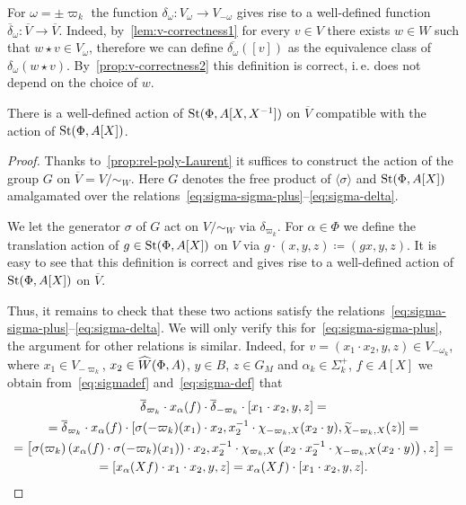 For $\omega = \pm \varpi_k$ the function $\delta_\omega \colon V_{\omega} \to V_{-\omega}$ gives rise to a well-defined function $\overline{\delta}_\omega \colon \overline{V} \to \overline{V}.$
Indeed, by~\cref{lem:v-correctness1} for every $v \in V$ there exists $w \in W$ such that $w \star v \in V_\omega$, therefore
we can define $\overline{\delta_\omega}([v])$ as the equivalence class of $\delta_{\omega}(w \star v)$.
By~\cref{prop:v-correctness2} this definition is correct, i.\,e. does not depend on the choice of $w$.

\begin{prop}
    There is a well-defined action of $\operatorname{St}(\Phi, A[X, X^{-1}])$ on $\overline{V}$ compatible with the action of $\operatorname{St}(\Phi, A[X])$.
\end{prop}
\begin{proof}
    Thanks to~\cref{prop:rel-poly-Laurent} it suffices to construct the action of the group $G$ on $\overline{V} = V/\sim_W$.
    Here $G$ denotes the free product of $\langle \sigma \rangle$ and $\operatorname{St}(\Phi, A[X])$ amalgamated over the relations~\eqref{eq:sigma-sigma-plus}--\eqref{eq:sigma-delta}.

    We let the generator $\sigma$ of $G$ act on $V/\sim_W$ via $\delta_{\varpi_k}$.
    For $\alpha \in \Phi$ we define the translation action of $g \in \operatorname{St}(\Phi, A[X])$ on $V$ via $g \cdot (x, y, z) \coloneqq (gx, y, z)$.
    It is easy to see that this definition is correct and gives rise to a well-defined action of $\operatorname{St}(\Phi, A[X])$ on $\overline{V}$.

    Thus, it remains to check that these two actions satisfy the relations~\eqref{eq:sigma-sigma-plus}--\eqref{eq:sigma-delta}.
    We will only verify this for~\eqref{eq:sigma-sigma-plus}, the argument for other relations is similar.
    Indeed, for $v = (x_1 \cdot x_2, y, z) \in V_{-\omega_k}$, where $x_1 \in V_{-\varpi_k}$, $x_2 \in \widehat{W}(\Phi, A)$, $y \in B$, $z \in G_M$ and $\alpha_k \in \Sigma_k^+$, $f \in A[X]$
     we obtain from~\eqref{eq:sigmadef} and~\eqref{eq:sigma-def} that
    \begin{multline*}
        \overline{\delta}_{\varpi_k} \cdot x_\alpha(f) \cdot \overline{\delta}_{-\varpi_k} \cdot [x_1 \cdot x_2, y, z] = \\
        = \overline{\delta}_{\varpi_k} \cdot x_\alpha(f) \cdot [\sigma(-\varpi_k)(x_1) \cdot x_2, x_2^{-1} \cdot \chi_{-\varpi_k, X}(x_2 \cdot y), \widetilde{\chi}_{-\varpi_k, X}(z)] = \\
        = \left[\sigma(\varpi_k)\left(x_{\alpha}(f) \cdot \sigma(-\varpi_k)(x_1)\right) \cdot x_2, x_2^{-1} \cdot \chi_{\varpi_k, X}\left(x_2 \cdot x_2^{-1} \cdot \chi_{-\varpi_k, X}(x_2 \cdot y)\right), z\right] = \\
        = [x_\alpha(Xf) \cdot x_1 \cdot x_2, y, z] = x_\alpha(Xf) \cdot [x_1 \cdot x_2, y, z]. \qedhere
    \end{multline*}
\end{proof}

